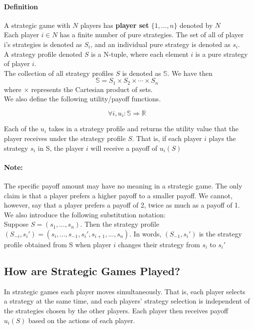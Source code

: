 \documentclass[12pt]{article}
\newcommand{\Note}{\paragraph{Note:}}
\newcommand{\Definition}{\paragraph{Definition}}
\begin{document}
	\Definition A strategic game with $N$ players has \textbf{player set} $\{1,...,n\}$ denoted by $N$\\
	
	Each player $i \in N$ has a finite number of pure strategies. The set of all of player i's strategies is denoted as $S_i$, and an individual pure strategy is denoted as $s_i$.\\
	
	A strategy profile denoted $S$ is a N-tuple, where each element $i$ is a pure strategy of player $i$.\\
	
	The collection of all strategy profiles $S$ is denoted as $\mathbb{S}$. We have then 
	\begin{equation*}
	\mathbb{S} = S_1 \times S_2 \times \cdots \times S_n
	\end{equation*} where $\times$ represents the Cartesian product of sets.\\
	
	We also define the following utility/payoff functions.
	
	\begin{equation*}
	\forall i, u_i : \mathbb{S} \Rightarrow \mathbb{R}
	\end{equation*}
	
	Each of the $u_i$ takes in a strategy profile and returns the utility value that the player receives under the strategy profile $S$. That is, if each player $i$ plays the strategy $s_i$ in S, the player $i$ will receive a payoff of $u_i(S)$
	
	\Note The specific payoff amount may have no meaning in a strategic game. The only claim is that a player prefers a higher payoff to a smaller payoff. We cannot, however, say that a player prefers a payoff of 2, twice as much as a payoff of 1.\\
	
	We also introduce the following substitution notation:\\
	
	Suppose $S = (s_1,...,s_n)$. Then the strategy profile $(S_{-i},s_i') = (s_i,...,s_{-1},s_i',s_{i+1},...,s_n)$. In words, $(S_{-1},s_i')$ is the strategy profile obtained from S when player $i$ changes their strategy from $s_i$ to $s_i'$\\
	
	\subsection{How are Strategic Games Played?}
	In strategic games each player moves simultaneously. That is, each player selects a strategy at the same time, and each players' strategy selection is independent of the strategies chosen by the other players. Each player then receives payoff $u_i(S)$ based on the actions of each player.\\
	
\end{document}
